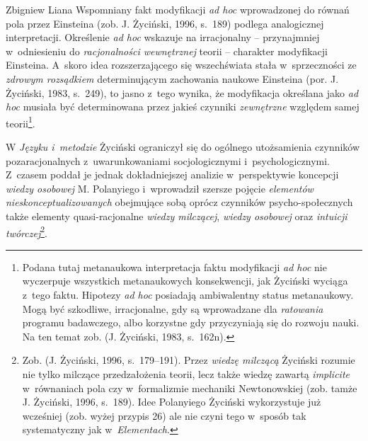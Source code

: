 \begin{artplenv}{Zbigniew Liana}
Wspomniany fakt modyfikacji \textit{ad hoc} wprowadzonej do równań pola przez Einsteina \label{ref:RNDuYYfgAN5No}(zob. J.
Życiński, 1996, s.~189) podlega analogicznej interpretacji. Określenie \textit{ad hoc} wskazuje na irracjonalny --
przynajmniej w~odniesieniu do \textit{racjonalności wewnętrznej} teorii -- charakter modyfikacji Einsteina. A~skoro idea
rozszerzającego się wszechświata stała w~sprzeczności ze \textit{zdrowym rozsądkiem} determinującym zachowania naukowe
Einsteina \label{ref:RNDcdQNYoHSWz}(por. J. Życiński, 1983, s.~249), to jasno z~tego wynika, że modyfikacja określana
jako \textit{ad hoc} musiała być determinowana przez jakieś czynniki \textit{zewnętrzne} względem samej
teorii\footnote{Podana tutaj metanaukowa interpretacja faktu modyfikacji \textit{ad hoc} nie wyczerpuje wszystkich
metanaukowych konsekwencji, jak Życiński wyciąga z~tego faktu. Hipotezy \textit{ad hoc} posiadają ambiwalentny status
metanaukowy. Mogą być szkodliwe, irracjonalne, gdy są wprowadzane dla \textit{ratowania} programu badawczego, albo
korzystne gdy przyczyniają się do rozwoju nauki. Na ten temat zob. \label{ref:RNDbdDBcwL7tT}(J. Życiński, 1983, s.~162n).}.

W \textit{Języku i~metodzie} Życiński ograniczył się do ogólnego utożsamienia czynników pozaracjonalnych z~uwarunkowaniami
socjologicznymi i~psychologicznymi. Z~czasem poddał je jednak dokładniejszej analizie w~perspektywie koncepcji
\textit{wiedzy osobowej} M. Polanyiego i~wprowadził szersze pojęcie \textit{elementów nieskonceptualizowanych} obejmujące
sobą oprócz czynników psycho-społecznych także elementy quasi-racjonalne \textit{wiedzy milczącej}, \textit{wiedzy osobowej}
oraz \textit{intuicji twórczej}\footnote{Zob. \label{ref:RNDTM62j2cxS8}(J. Życiński, 1996, s.~179–191). Przez
\textit{wiedzę milczącą} Życiński rozumie nie tylko milczące przedzałożenia teorii, lecz także wiedzę zawartą
\textit{implicite} w~równaniach pola czy w~formalizmie mechaniki Newtonowskiej \label{ref:RNDBBgSxRheRf}(zob. tamże J.
Życiński, 1996, s.~189). Idee Polanyiego Życiński wykorzystuje już wcześniej (zob. wyżej przypis 26) ale nie czyni
tego w~sposób tak systematyczny jak w~\textit{Elementach}.}.


\end{artplenv}
